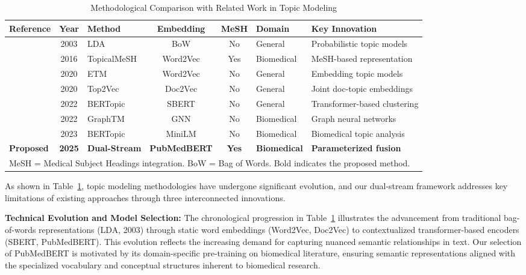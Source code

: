 \documentclass[utf8]{FrontiersinHarvard}
\begin{document}
\begin{table}[!t]
\centering
\caption{Methodological Comparison with Related Work in Topic Modeling}
\label{tab:comparison}
\renewcommand{\arraystretch}{1.3}
\begin{tabular}{lclccll}
\hline
\textbf{Reference} & \textbf{Year} & \textbf{Method} & \textbf{Embedding} & \textbf{MeSH} & \textbf{Domain} & \textbf{Key Innovation} \\
\hline
\citet{blei_latent_2003} & 2003 & LDA & BoW & No & General & Probabilistic topic models \\
\citet{yu_improving_2016} & 2016 & TopicalMeSH & Word2Vec & Yes & Biomedical & MeSH-based representation \\
\citet{dieng_topic_2020} & 2020 & ETM & Word2Vec & No & General & Embedding topic models \\
\citet{angelov_top2vec_2020} & 2020 & Top2Vec & Doc2Vec & No & General & Joint doc-topic embeddings \\
\citet{grootendorst_bertopic_2022} & 2022 & BERTopic & SBERT & No & General & Transformer-based clustering \\
\citet{wang_graph-embedded_2022} & 2022 & GraphTM & GNN & No & Biomedical & Graph neural networks \\
\citet{lezhnina_depression_2023} & 2023 & BERTopic & MiniLM & No & Biomedical & Biomedical topic analysis \\
\hline
\textbf{Proposed} & \textbf{2025} & \textbf{Dual-Stream} & \textbf{PubMedBERT} & \textbf{Yes} & \textbf{Biomedical} & \textbf{Parameterized fusion} \\
\hline
\multicolumn{7}{l}{\footnotesize MeSH = Medical Subject Headings integration. BoW = Bag of Words. Bold indicates the proposed method.} \\
\end{tabular}
\end{table}

As shown in Table~\ref{tab:comparison}, topic modeling methodologies have undergone significant evolution, and our dual-stream framework addresses key limitations of existing approaches through three interconnected innovations.

\textbf{Technical Evolution and Model Selection:} The chronological progression in Table~\ref{tab:comparison} illustrates the advancement from traditional bag-of-words representations (LDA, 2003) through static word embeddings (Word2Vec, Doc2Vec) to contextualized transformer-based encoders (SBERT, PubMedBERT). This evolution reflects the increasing demand for capturing nuanced semantic relationships in text. Our selection of PubMedBERT is motivated by its domain-specific pre-training on biomedical literature, ensuring semantic representations aligned with the specialized vocabulary and conceptual structures inherent to biomedical research.
\end{document}
